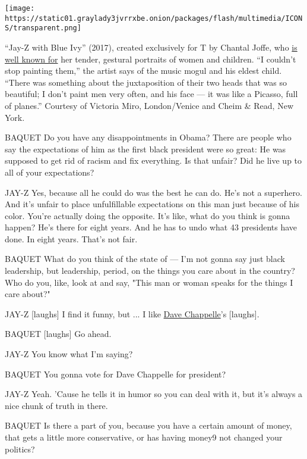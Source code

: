 \texttt{[image: https://static01.graylady3jvrrxbe.onion/packages/flash/multimedia/ICONS/transparent.png]}

``Jay-Z with Blue Ivy'' (2017), created exclusively for T by Chantal
Joffe, who
\href{https://www.nytimes3xbfgragh.onion/slideshow/2016/03/20/t-magazine/just-kids/s/03well-portfolio-slide-C2YH.html}{is
well known for} her tender, gestural portraits of women and children.
``I couldn't stop painting them,'' the artist says of the music mogul
and his eldest child. ``There was something about the juxtaposition of
their two heads that was so beautiful; I don't paint men very often, and
his face --- it was like a Picasso, full of planes.'' Courtesy of
Victoria Miro, London/Venice and Cheim \& Read, New York.

BAQUET Do you have any disappointments in Obama? There are people who
say the expectations of him as the first black president were so great:
He was supposed to get rid of racism and fix everything. Is that unfair?
Did he live up to all of your expectations?

JAY-Z Yes, because all he could do was the best he can do. He's not a
superhero. And it's unfair to place unfulfillable expectations on this
man just because of his color. You're actually doing the opposite. It's
like, what do you think is gonna happen? He's there for eight years. And
he has to undo what 43 presidents have done. In eight years. That's not
fair.

BAQUET What do you think of the state of --- I'm not gonna say just
black leadership, but leadership, period, on the things you care about
in the country? Who do you, like, look at and say, "This man or woman
speaks for the things I care about?"

JAY-Z {[}laughs{]} I find it funny, but ... I like
\href{https://www.nytimes3xbfgragh.onion/2017/04/19/t-magazine/dave-chappelle-profile.html}{Dave
Chappelle}'s {[}laughs{]}.

BAQUET {[}laughs{]} Go ahead.

JAY-Z You know what I'm saying?

BAQUET You gonna vote for Dave Chappelle for president?

JAY-Z Yeah. 'Cause he tells it in humor so you can deal with it, but
it's always a nice chunk of truth in there.

BAQUET Is there a part of you, because you have a certain amount of
money, that gets a little more conservative, or has having money9 not
changed your politics?

